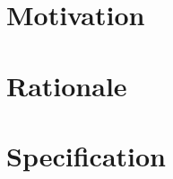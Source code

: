 \documentclass{simplewhitepaper}
\author{Christopher Sweet}
\title{\documenttitle}
\begin{document}
	\maketitle
	\newpage

	\section{Motivation}

	\section{Rationale}

	\section{Specification}
\end{document}
